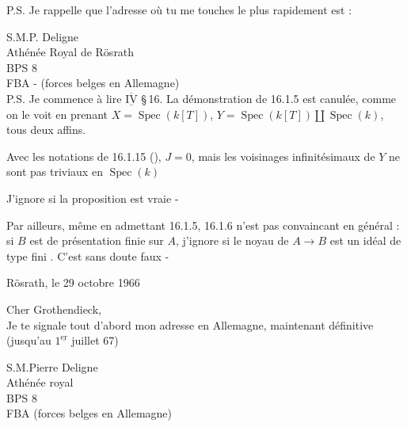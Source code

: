 P.S. Je rappelle que l'adresse où tu me touches le plus rapidement est :

S.M.\quad P. Deligne\\
Athénée Royal de Rösrath\\
BPS 8\\
FBA - (forces belges en Allemagne)\\

P.S. Je commence à lire $\overline{\underline{\mathrm{IV}}}$ \S\,16. La démonstration de 16.1.5 est canulée, comme on le voit en prenant $X=\operatorname{Spec}(k[T])$, $Y=\operatorname{Spec}(k[T])\amalg\operatorname{Spec}(k)$, tous deux affins.


Avec les notations de 16.1.15 (), $J=0$, mais les voisinages infinitésimaux de $Y$ ne sont pas  triviaux en $\operatorname{Spec}(k)$

J'ignore si la proposition est vraie -

Par ailleurs, même en admettant 16.1.5, 16.1.6 n'est pas convaincant en général : si $B$ est de présentation finie sur $A$, j'ignore si le noyau de $A\longrightarrow B$ est un idéal de type fini . C'est sans doute faux -

Rösrath, le 29 octobre 1966\\


Cher Grothendieck,\\

Je te signale tout d'abord mon adresse en Allemagne, maintenant définitive (jusqu'au $1^{\underline{\mathrm{er}}}$ juillet 67)

S.M.\quad Pierre Deligne\\
Athénée royal\\
BPS 8\\
FBA (forces belges en Allemagne)\\

